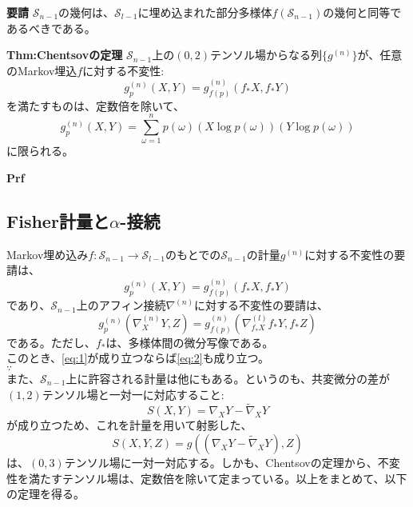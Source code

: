 \documentclass[a4paper,11pt]{jsarticle}
\numberwithin{equation}{section}
\begin{document}

\begin{itembox}[l]{\textbf{要請}}
    $\mathcal{S}_{n-1}$の幾何は、$\mathcal{S}_{l-1}$に埋め込まれた部分多様体$f(\mathcal{S}_{n-1})$の幾何と同等であるべきである。
\end{itembox}

\begin{itembox}[l]{\textbf{Thm:Chentsovの定理}}
    $\mathcal{S}_{n-1}$上の$(0,2)$テンソル場からなる列$\{g^{(n)}\}$が、任意のMarkov埋込$f$に対する不変性:
    \begin{equation}
        g^{(n)}_p(X,Y) = g^{(n)}_{f(p)}(f_*X,f_*Y)
    \end{equation}
    を満たすものは、定数倍を除いて、
    \begin{equation}
        g^{(n)}_p(X,Y) = \sum_{\omega = 1}^{n} p(\omega) (X\log p(\omega))(Y\log p(\omega))
    \end{equation}
    に限られる。
\end{itembox}
\textbf{Prf}\\

\subsection{Fisher計量と$\alpha$-接続}
Markov埋め込み$f: \mathcal{S}_{n-1} \to \mathcal{S}_{l-1}$のもとでの$\mathcal{S}_{n-1}$の計量$g^{(n)}$に対する不変性の要請は、
\begin{equation}
    \label{eq:1}
    g^{(n)}_p(X,Y) = g^{(n)}_{f(p)}(f_*X,f_*Y)
\end{equation}
であり、$\mathcal{S}_{n-1}$上のアフィン接続$\nabla^{(n)}$に対する不変性の要請は、
\begin{equation}
    \label{eq:2}
    g^{(n)}_p(\nabla^{(n)}_X Y,Z) = g^{(n)}_{f(p)}(\nabla^{(l)}_{f_*X} f_*Y,f_*Z)
\end{equation}
である。ただし、$f_*$は、多様体間の微分写像である。\\

このとき、\ref{eq:1}が成り立つならば\ref{eq:2}も成り立つ。\\
$\because$\\

また、$\mathcal{S}_{n-1}$上に許容される計量は他にもある。というのも、共変微分の差が$(1,2)$テンソル場と一対一に対応すること:
\begin{equation}
    S(X,Y) = \nabla_X Y - \tilde{\nabla}_X Y
\end{equation}
が成り立つため、これを計量を用いて射影した、
\begin{equation}
    S(X,Y,Z) = g((\nabla_X Y - \tilde{\nabla}_X Y),Z)
\end{equation}
は、$(0,3)$テンソル場に一対一対応する。しかも、Chentsovの定理から、不変性を満たすテンソル場は、定数倍を除いて定まっている。以上をまとめて、以下の定理を得る。\\
\end{document}
